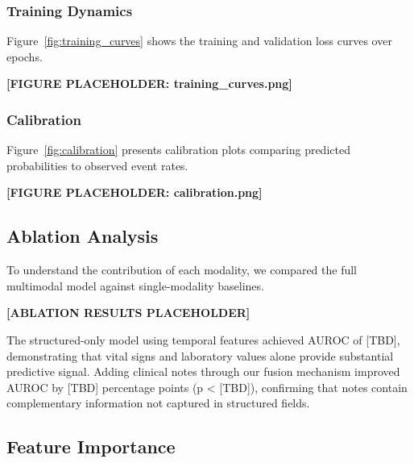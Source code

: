 \subsubsection{Training Dynamics}

Figure~\ref{fig:training_curves} shows the training and validation loss curves over epochs.

\textbf{[FIGURE PLACEHOLDER: training\_curves.png]}


\subsubsection{Calibration}

Figure~\ref{fig:calibration} presents calibration plots comparing predicted probabilities to observed event rates.

\textbf{[FIGURE PLACEHOLDER: calibration.png]}


\subsection{Ablation Analysis}

To understand the contribution of each modality, we compared the full multimodal model against single-modality baselines.

\textbf{[ABLATION RESULTS PLACEHOLDER]}

The structured-only model using temporal features achieved AUROC of [TBD], demonstrating that vital signs and laboratory values alone provide substantial predictive signal. Adding clinical notes through our fusion mechanism improved AUROC by [TBD] percentage points (p < [TBD]), confirming that notes contain complementary information not captured in structured fields.

\subsection{Feature Importance}

